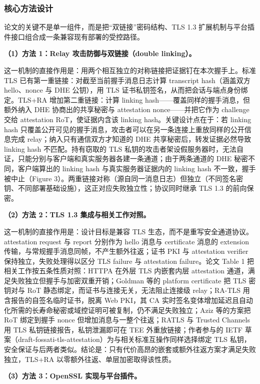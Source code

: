 \documentclass[11pt]{ctexart}
\begin{document}
\subsubsection{核心方法设计}
论文的关键不是单一组件，而是把“双链接”密码结构、TLS 1.3 扩展机制与平台插件接口组合成一条兼容现有部署的受控路径。\par
\noindent\textbf{（1）方法 1：Relay 攻击防御与双链接（double linking）。}\par
这一机制的直接作用是：用两个相互独立的对称链接把证据钉在本次握手上。标准 TLS 已有第一重链接：对截至当前握手消息日志计算 transcript hash（涵盖双方 hello、nonce 与 DHE 公钥），用 TLS 证书私钥签名，从而把会话与端点身份绑定。TLS+RA 增加第二重链接：计算 linking hash——覆盖同样的握手消息，但额外纳入 DHE 协商出的共享秘密与 attestation nonce——并把它作为 challenge 交给 attestation RoT，使证据内含该 linking hash。关键设计点在于：若 linking hash 只覆盖公开可见的握手消息，攻击者可以在另一条连接上重放同样的公开信息完成 relay；纳入只有通信双方才知道的 DHE 共享秘密后，转发证据必然导致 linking hash 不匹配。持有窃取的 TLS 私钥的攻击者架设假服务器时，无法自证，只能分别与客户端和真实服务器各建一条通道；由于两条通道的 DHE 秘密不同，客户端算出的 linking hash 与真实服务器证据内的 linking hash 不一致，握手被中止（Figure 3）。两重链接对称（源自同一消息日志）但独立（不同签名密钥、不同部署基础设施），这正对应失败独立性；协议同时继承 TLS 1.3 的前向保密。\par
\noindent\textbf{（2）方法 2：TLS 1.3 集成与相关工作对照。}\par
这一机制的直接作用是：设计目标是兼容 TLS 生态，而不是重写安全通道协议。attestation request 与 report 分别作为 hello 消息与 certificate 消息的 extension 传输，与常规握手消息同帧，不产生额外往返；证书 PKI 与 attestation verifier 保持独立，失败处理得以区分 TLS failure 与 attestation failure。论文 Table 1 把相关工作按五条性质对照：HTTPA 在外层 TLS 内嵌套内层 attestation 通道，满足失败独立但握手与加密双重开销；Goldman 等的 platform certificate 把 TLS 密钥对与 RoT 静态绑定，而证书与连接无关，无法阻止连接级 relay；RA-TLS 用含报告的自签名临时证书，脱离 Web PKI，其 CA 实时签名变体增加延迟且自动化所需的长寿命秘密或域控证明可被复制，仍不满足失败独立；Aziz 等的方案把 RoT 绑定到握手 nonce 但增加消息与一整个往返；RATLS 与 Trusted Channels 用 TLS 私钥链接报告，私钥泄漏即可在 TEE 外重放链接；作者参与的 IETF 草案（draft-fossati-tls-attestation）为与相关标准互操作同样选择绑定 TLS 私钥，安全保证与后两者类似。结论是：只有代价高昂的嵌套或额外往返方案才满足失败独立，TLS+RA 以零额外往返、单层加密取得该性质。\par
\noindent\textbf{（3）方法 3：OpenSSL 实现与平台插件。}\par
\end{document}
